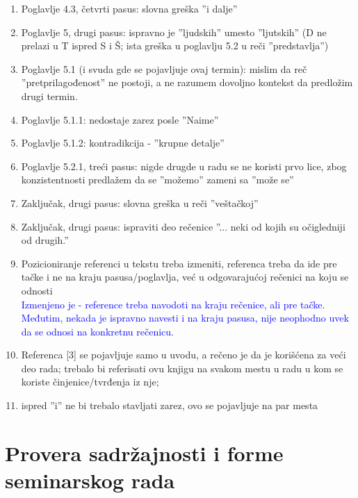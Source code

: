 \documentclass[a4paper]{report}
\newcommand{\odgovor}[1]{\textcolor{blue}{#1}}
\begin{document}
\begin{enumerate}
\item Poglavlje 4.3, četvrti pasus: slovna greška ''i dalje''

\item Poglavlje 5, drugi pasus: ispravno je ''ljudskih'' umesto ''ljutskih'' (D ne prelazi u T ispred S i Š; ista greška u poglavlju 5.2 u reči ''predstavlja'')

\item Poglavlje 5.1 (i svuda gde se pojavljuje ovaj termin): mislim da reč ''pretprilagođenost'' ne postoji, a ne razumem dovoljno kontekst da predložim drugi termin.

\item Poglavlje 5.1.1: nedostaje zarez posle ''Naime''

\item Poglavlje 5.1.2: kontradikcija - ''krupne detalje''

\item Poglavlje 5.2.1, treći pasus: nigde drugde u radu se ne koristi prvo lice, zbog konzistentnosti predlažem da se ''možemo'' zameni sa ''može se''

\item Zaključak, drugi pasus: slovna greška u reči ''veštačkoj''

\item Zaključak, drugi pasus: ispraviti deo rečenice ''... neki od kojih su očigledniji od drugih.''

\item Pozicioniranje referenci u tekstu treba izmeniti, referenca treba da ide pre tačke i ne na kraju pasusa/poglavlja, već u odgovarajućoj rečenici na koju se odnosti \\
\odgovor{Izmenjeno je - reference treba navodoti na kraju rečenice, ali pre tačke. Međutim, nekada je ispravno navesti i na kraju pasusa, nije neophodno uvek da se odnosi na konkretnu rečenicu.}

\item Referenca [3] se pojavljuje samo u uvodu, a rečeno je da je korišćena za veći deo rada; trebalo bi referisati ovu knjigu na svakom mestu u radu u kom se koriste činjenice/tvrđenja iz nje; 

\item ispred ''i'' ne bi trebalo stavljati zarez, ovo se pojavljuje na par mesta
\end{enumerate}


\section{Provera sadržajnosti i forme seminarskog rada}
\end{document}
